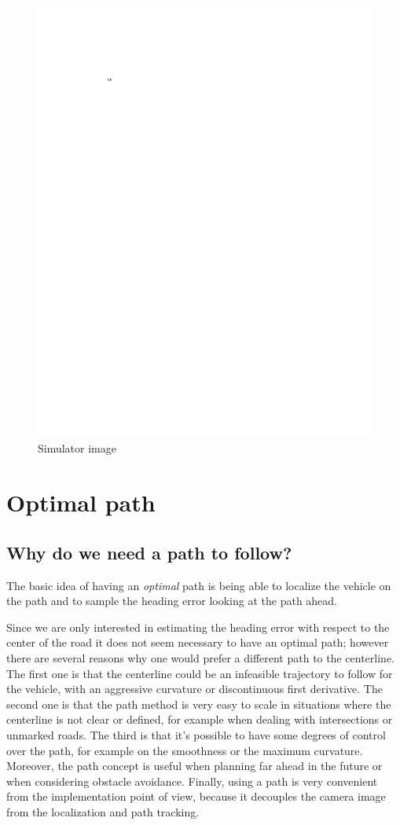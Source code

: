 \documentclass[a4paper,12pt,sort&compress]{article}
\begin{document}
    \begin{figure}
        \centering
        \includegraphics[width=0.8\linewidth]{a.pdf}
        \caption{ Simulator image }
        \label{fig:simulator}
    \end{figure}



\section{Optimal path}

    \subsection{Why do we need a path to follow?}
    The basic idea of having an \textit{optimal} path is being able to localize the vehicle on the
    path and to sample the heading error looking at the path ahead. 

    Since we are only interested in estimating the heading error with respect to the center of the
    road it does not seem necessary to have an optimal path; however there are several reasons
    why one would prefer a different path to the centerline. The first one is that the centerline
    could be an infeasible trajectory to follow for the vehicle, with an aggressive curvature or
    discontinuous first derivative. The second one is that the path
    method is very easy to scale in situations where the centerline is not clear or defined, for
    example when dealing with intersections or unmarked roads. The third is that it's possible to
    have some degrees of control over the path, for example on the smoothness or the maximum
    curvature. Moreover, the path concept is useful when planning far ahead in the future or when
    considering obstacle avoidance. Finally, using a path is very convenient from the implementation point of
    view, because it decouples the camera image from the localization and path tracking.
\end{document}
